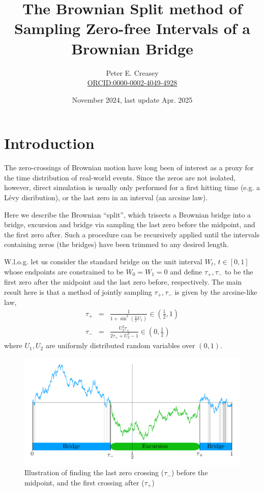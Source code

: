 \documentclass{article}
\title{The Brownian Split method of Sampling Zero-free Intervals of a Brownian Bridge}
\author{Peter E. Creasey \\
  \href{https://orcid.org/0000-0002-4049-4928}{ORCID:0000-0002-4049-4928}}
\date{November 2024, last update Apr. 2025}
\newcommand{\tm}{{\tau_{\mathrm{-}}}}
\newcommand{\tp}{{\tau_{\mathrm{+}}}}
\begin{document}
\maketitle

\section{Introduction}

The zero-crossings of Brownian motion have long been of interest as a proxy for the time distribution of real-world events. Since the zeros are not isolated, however, direct simulation is usually only performed for a first hitting time (e.g. a L\'evy disribution), or the last zero in an interval (an arcsine law).

Here we describe the Brownian ``split'', which trisects a Brownian bridge into a bridge, excursion and bridge via sampling the last zero before the midpoint, and the first zero after. Such a procedure can be recursively applied until the intervals containing zeros (the bridges) have been trimmed to any desired length.

W.l.o.g. let us consider the standard bridge on the unit interval $W_t$, $t\in [0,1]$ whose endpoints are constrained to be $W_0=W_1=0$ and define $\tp,\tm$ to be the first zero after the midpoint and the last zero before, respectively. The main result here is that a method of jointly sampling $\tp,\tm$ is given by the arcsine-like law,
\begin{eqnarray}
\tp &=& \frac{1}{1+\sin^2 \left( \frac{\pi}{2} U_1 \right)} \in \left(\frac{1}{2},1\right) \label{eq:stp} \\
\tm &=& \frac{U_2^2 \tp}{2\tp + U_2^2 -1} \in \left(0,\frac{1}{2}\right)  \label{eq:stm}
\end{eqnarray}
where $U_1,U_2$ are uniformly distributed random variables over $(0,1)$.
\begin{figure}[H]
\centering
\includegraphics[width=\columnwidth]{figs/illustration.png}
\caption{Illustration of finding the last zero crossing ($\tm$) before the midpoint, and the first crossing after ($\tp$)}
\end{figure}
\end{document}
